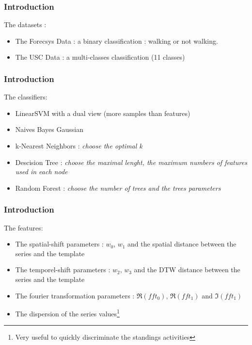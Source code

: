 \documentclass[11pt, sans]{beamer}
\begin{document}
\begin{frame}
	\frametitle{Introduction}
		The datasets :
	\begin{itemize}
		\item The Forecsys Data : a binary classification : walking or not walking.
		\item The USC Data : a multi-classes classification (11 classes)
	\end{itemize}
\end{frame}

\begin{frame}
\frametitle{Introduction}
	The classifiers:
	\begin{itemize}
		\item LinearSVM with a dual view (more samples than features)
		\item Naives Bayes Gaussian
		\item k-Nearest Neighbors : \textit{choose the optimal k}
		\item Descision Tree : \textit{choose the maximal lenght, the maximum numbers of features used in each node}
		\item Random Forest : \textit{choose the number of trees and the trees parameters}	
	\end{itemize}		
\end{frame}		
	
\begin{frame}
\frametitle{Introduction}
	The features:
	\begin{itemize}
		\item The spatial-shift parameters : $w_0$, $w_1$ and the spatial distance between the series and the template
		\item The temporel-shift parameters : $w_2$, $w_3$ and the DTW distance between the series and the template
		\item The fourier transformation parameters : $\Re(fft_0)$, $\Re(fft_1)$ and $\Im(fft_1)$
		\item The dispersion of the series values\footnote{Very useful to quickly discriminate the standings activities}
	\end{itemize}
\end{frame}
\end{document}
